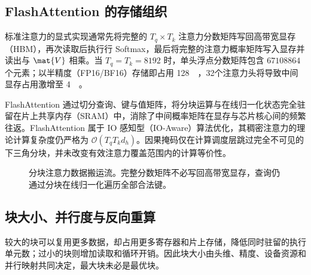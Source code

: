 \documentclass[../textbook.tex]{subfiles}
\begin{document}
\subsection{FlashAttention 的存储组织}

标准注意力的显式实现通常先将完整的 $T_q\times T_k$ 注意力分数矩阵写回高带宽显存（HBM），再次读取后执行行 Softmax，最后将完整的注意力概率矩阵写入显存并读出与 $\mat{V}$ 相乘。当 $T_q=T_k=8192$ 时，单头浮点分数矩阵包含 $\num{67108864}$ 个元素；以半精度（FP16/BF16）存储即占用 \qty{128}{\mebi\byte}，32个注意力头将导致中间显存占用激增至 \qty{4}{\gibi\byte}。

FlashAttention 通过切分查询、键与值矩阵，将分块运算与在线归一化状态完全驻留在片上共享内存（SRAM）中，消除了中间概率矩阵在显存与芯片核心间的频繁往返\autocite{dao2022flashattention}。FlashAttention 属于 IO 感知型（IO-Aware）算法优化，其稠密注意力的理论计算复杂度仍严格为 $\mathcal{O}(T_q T_k d_h)$。因果掩码仅在计算调度层跳过完全不可见的下三角分块，并未改变有效注意力覆盖范围内的计算等价性。

\begin{figure}[htbp]
\centering
{}
\caption[分块注意力数据搬运流]{分块注意力数据搬运流。完整分数矩阵不必写回高带宽显存，查询仍通过分块在线归一化遍历全部合法键。}\label{fig:kernel-tiling}
\end{figure}

\subsection{块大小、并行度与反向重算}
较大的块可以复用更多数据，却占用更多寄存器和片上存储，降低同时驻留的执行单元数；过小的块则增加读取和循环开销。因此块大小由头维、精度、设备资源和并行映射共同决定，最大块未必是最优块。
\end{document}
